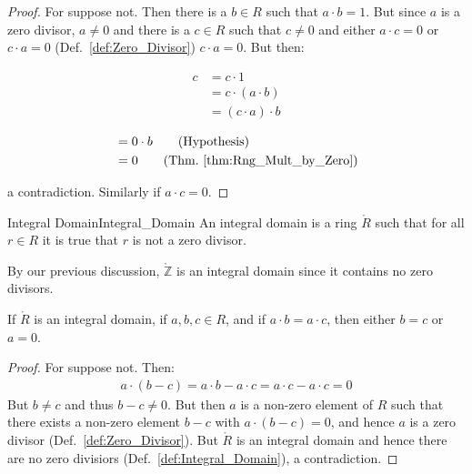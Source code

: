     \begin{proof}
        For suppose not. Then there is a $b\in{R}$ such that $a\cdot{b}=1$.
        But since $a$ is a zero divisor, $a\ne{0}$ and there is a $c\in{R}$
        such that $c\ne{0}$ and either $a\cdot{c}=0$ or $c\cdot{a}=0$
        (Def.~\ref{def:Zero_Divisor}) $c\cdot{a}=0$. But then:
        \par
        \begin{minipage}[t]{0.49\textwidth}
            \begin{align*}
                c&=c\cdot{1}\tag{Identity}\\
                &=c\cdot(a\cdot{b})\tag{Inverse}\\
                &=(c\cdot{a})\cdot{b}\tag{Associativity}
            \end{align*}
        \end{minipage}
        \hfill
        \begin{minipage}[t]{0.49\textwidth}
            \centering
            \begin{align*}
                &=0\cdot{b}\tag{Hypothesis}\\
                &=0\tag{Thm.~\ref{thm:Rng_Mult_by_Zero}}
            \end{align*}
        \end{minipage}
        \par\vspace{2.5ex}
        a contradiction. Similarly if $a\cdot{c}=0$.
    \end{proof}
    \begin{fdefinition}{Integral Domain}{Integral_Domain}
        An integral domain is a ring $\ring{R}$ such that for all $r\in{R}$
        it is true that $r$ is not a zero divisor.
    \end{fdefinition}
    \begin{example}
        By our previous discussion, $\ring{\mathbb{Z}}$ is an integral
        domain since it contains no zero divisors.
    \end{example}
    \begin{theorem}
        \label{thm:Left_Cancellation_Law_Int_Domain}%
        If $\ring{R}$ is an integral domain, if $a,b,c\in{R}$, and if
        $a\cdot{b}=a\cdot{c}$, then either $b=c$ or $a=0$.
    \end{theorem}
    \begin{proof}
        For suppose not. Then:
        \begin{align}
            a\cdot(b-c)=a\cdot{b}-a\cdot{c}=a\cdot{c}-a\cdot{c}=0
        \end{align}
        But $b\ne{c}$ and thus $b-c\ne{0}$. But then $a$ is a non-zero
        element of $R$ such that there exists a non-zero element $b-c$ with
        $a\cdot(b-c)=0$, and hence $a$ is a zero divisor
        (Def.~\ref{def:Zero_Divisor}). But $\ring{R}$ is an integral domain
        and hence there are no zero divisiors
        (Def.~\ref{def:Integral_Domain}), a contradiction.
    \end{proof}
